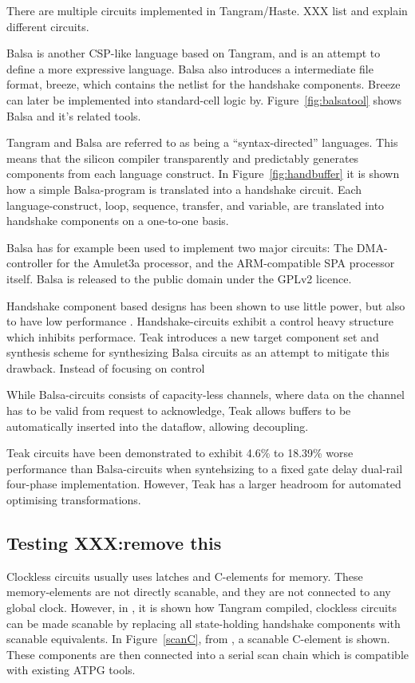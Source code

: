 There are multiple circuits implemented in Tangram/Haste. XXX list and
explain different circuits.

Balsa is another CSP-like language based on Tangram, and is an attempt
to define a more expressive language. Balsa also introduces a
intermediate file format, breeze, which contains the netlist for the
handshake components. Breeze can later be implemented into
standard-cell logic by. Figure~\ref{fig:balsatool} shows Balsa and
it's related tools.

Tangram and Balsa are referred to as being a ``syntax-directed''
languages. This means that the silicon compiler transparently and
predictably generates components from each language construct. In
Figure~\ref{fig:handbuffer} it is shown how a simple Balsa-program is
translated into a handshake circuit. Each language-construct, loop,
sequence, transfer, and variable, are translated into handshake
components on a one-to-one basis.

Balsa has for example been used to implement two major circuits: The
DMA-controller for the Amulet3a processor, and the ARM-compatible SPA
processor itself. Balsa is released to the public domain under the
GPLv2 licence.

Handshake component based designs has been shown to use little power,
but also to have low performance \cite{80c51}. Handshake-circuits
exhibit a control heavy structure which inhibits performace. Teak
\cite{teak} introduces a new target component set and synthesis scheme
for synthesizing Balsa circuits as an attempt to mitigate this
drawback. Instead of focusing on control

While Balsa-circuits consists of capacity-less channels, where data on
the channel has to be valid from request to acknowledge, Teak allows
buffers to be automatically inserted into the dataflow, allowing
decoupling. 

Teak circuits have been demonstrated to exhibit 4.6\% to 18.39\% worse
performance than Balsa-circuits when syntehsizing to a fixed gate
delay dual-rail four-phase implementation. However, Teak has a larger
headroom for automated optimising transformations.

\subsection{Testing XXX:remove this}


Clockless circuits usually uses latches and C-elements for
memory. These memory-elements are not directly scanable, and they are
not connected to any global clock. However, in \cite{fullscan}, it is
shown how Tangram compiled, clockless circuits can be made scanable by
replacing all state-holding handshake components with scanable
equivalents. In Figure~\ref{scanC}, from \cite{fullscan}, a scanable
C-element is shown. These components are then connected into a serial
scan chain which is compatible with existing ATPG tools.

